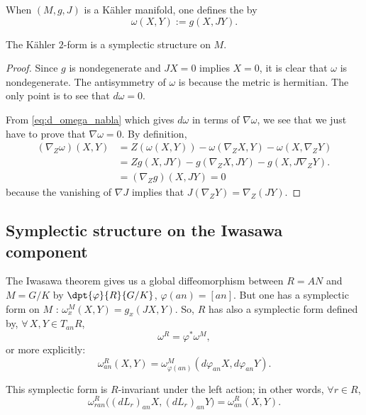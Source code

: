 When $(M,g,J)$ is a Kähler manifold, one defines the  by
\begin{equation}
\omega(X,Y):=g(X,JY).
\end{equation}

\begin{proposition}
The Kähler $2$-form is a symplectic structure on $M$.
\end{proposition}

\begin{proof}
Since $g$ is nondegenerate and $JX=0$ implies $X=0$, it is clear that $\omega$ is nondegenerate. The antisymmetry of $\omega$ is because the metric is hermitian. The only point is to see that $d\omega=0$.

From \eqref{eq:d_omega_nabla} which gives $d\omega$ in terms of $\nabla\omega$, we see that we just have to prove that $\nabla\omega=0$. By definition,
\begin{align*}
(\nabla_Z\omega)(X,Y)&=Z(\omega(X,Y))-\omega(\nabla_ZX,Y)-\omega(X,\nabla_ZY)\\
                     &=Zg(X,JY)-g(\nabla_ZX,JY)-g(X,J\nabla_ZY).\\
                     &=(\nabla_Zg)(X,JY)=0
\end{align*}		     
because the vanishing of $\nabla J$ implies that $J(\nabla_ZY)=\nabla_Z(JY)$.
\end{proof}

\subsection{Symplectic structure on the Iwasawa component}

The Iwasawa theorem gives us a global diffeomorphism between $R=AN$ and $M=G/K$ by $\dpt{\varphi}{R}{G/K}$, $\varphi(an)=[an]$. But one has a symplectic form on $M$ : $\omega^M_x(X,Y)=g_x(JX,Y)$. So, $R$ has also a symplectic form defined by, $\forall\,X,Y\in T_{an}R$,
\begin{equation}
\omega^R=\varphi^*\omega^M,
\end{equation}
or more explicitly:
\[
  \omega^R_{an}(X,Y)=\omega^M_{\varphi(an)}(d\varphi_{an}X,d\varphi_{an}Y).
\]

\begin{proposition}
This symplectic form is $R$-invariant under the left action; in other words,  $\forall r\in R$,
\begin{equation}
\omega_{ran}^R\Big(  (dL_r)_{an}X,(dL_r)_{an}Y  \Big)=\omega^R_{an}(X,Y).
\end{equation}

\end{proposition}

